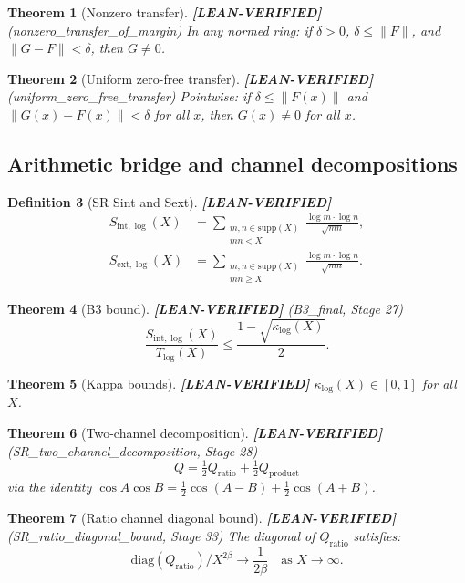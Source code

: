 \documentclass[11pt]{article}
\newtheorem{theorem}{Theorem}[section]
\newtheorem{definition}[theorem]{Definition}
\theoremstyle{remark}
\newcommand{\LEANVERIFIED}{\textbf{\color{green!60!black}[LEAN-VERIFIED]}}
\begin{document}
\begin{theorem}[Nonzero transfer] \LEANVERIFIED{} \textnormal{(nonzero\_transfer\_of\_margin)}
In any normed ring: if $\delta > 0$, $\delta \leq \|F\|$, and $\|G - F\| < \delta$,
then $G \neq 0$.
\end{theorem}

\begin{theorem}[Uniform zero-free transfer] \LEANVERIFIED{} \textnormal{(uniform\_zero\_free\_transfer)}
Pointwise: if $\delta \leq \|F(x)\|$ and $\|G(x) - F(x)\| < \delta$ for all $x$,
then $G(x) \neq 0$ for all $x$.
\end{theorem}

\subsection{Arithmetic bridge and channel decompositions}

\begin{definition}[SR Sint and Sext] \LEANVERIFIED{}
\begin{align*}
S_{\mathrm{int},\log}(X) &= \sum_{\substack{m,n \in \mathrm{supp}(X) \\ mn < X}} \frac{\log m \cdot \log n}{\sqrt{mn}}, \\
S_{\mathrm{ext},\log}(X) &= \sum_{\substack{m,n \in \mathrm{supp}(X) \\ mn \geq X}} \frac{\log m \cdot \log n}{\sqrt{mn}}.
\end{align*}
\end{definition}

\begin{theorem}[B3 bound] \LEANVERIFIED{} \textnormal{(B3\_final, Stage 27)}
\[
\frac{S_{\mathrm{int},\log}(X)}{T_{\log}(X)} \leq \frac{1 - \sqrt{\kappa_{\log}(X)}}{2}.
\]
\end{theorem}

\begin{theorem}[Kappa bounds] \LEANVERIFIED{}
$\kappa_{\log}(X) \in [0, 1]$ for all $X$.
\end{theorem}

\begin{theorem}[Two-channel decomposition] \LEANVERIFIED{} \textnormal{(SR\_two\_channel\_decomposition, Stage 28)}
\[
Q = \tfrac{1}{2}Q_{\mathrm{ratio}} + \tfrac{1}{2}Q_{\mathrm{product}}
\]
via the identity $\cos A \cos B = \frac{1}{2}\cos(A-B) + \frac{1}{2}\cos(A+B)$.
\end{theorem}

\begin{theorem}[Ratio channel diagonal bound] \LEANVERIFIED{} \textnormal{(SR\_ratio\_diagonal\_bound, Stage 33)}
The diagonal of $Q_{\mathrm{ratio}}$ satisfies:
\[
\mathrm{diag}(Q_{\mathrm{ratio}})/X^{2\beta} \to \frac{1}{2\beta} \quad \text{as } X \to \infty.
\]
\end{theorem}
\end{document}
